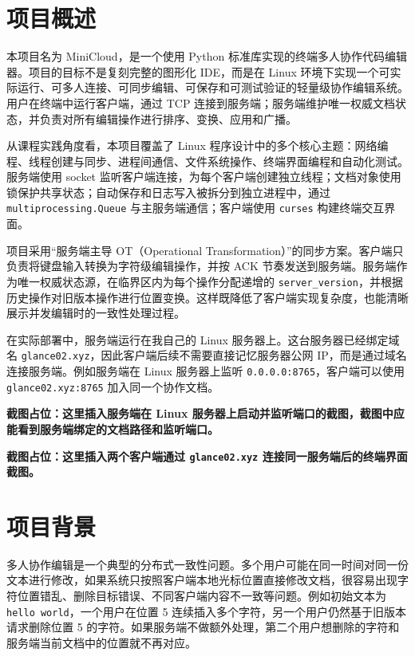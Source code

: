 \section{项目概述}

本项目名为 MiniCloud，是一个使用 Python 标准库实现的终端多人协作代码编辑器。项目的目标不是复刻完整的图形化 IDE，而是在 Linux 环境下实现一个可实际运行、可多人连接、可同步编辑、可保存和可测试验证的轻量级协作编辑系统。用户在终端中运行客户端，通过 TCP 连接到服务端；服务端维护唯一权威文档状态，并负责对所有编辑操作进行排序、变换、应用和广播。

从课程实践角度看，本项目覆盖了 Linux 程序设计中的多个核心主题：网络编程、线程创建与同步、进程间通信、文件系统操作、终端界面编程和自动化测试。服务端使用 socket 监听客户端连接，为每个客户端创建独立线程；文档对象使用锁保护共享状态；自动保存和日志写入被拆分到独立进程中，通过 \verb|multiprocessing.Queue| 与主服务端通信；客户端使用 \verb|curses| 构建终端交互界面。

项目采用“服务端主导 OT（Operational Transformation）”的同步方案。客户端只负责将键盘输入转换为字符级编辑操作，并按 ACK 节奏发送到服务端。服务端作为唯一权威状态源，在临界区内为每个操作分配递增的 \verb|server_version|，并根据历史操作对旧版本操作进行位置变换。这样既降低了客户端实现复杂度，也能清晰展示并发编辑时的一致性处理过程。

在实际部署中，服务端运行在我自己的 Linux 服务器上。这台服务器已经绑定域名 \verb|glance02.xyz|，因此客户端后续不需要直接记忆服务器公网 IP，而是通过域名连接服务端。例如服务端在 Linux 服务器上监听 \verb|0.0.0.0:8765|，客户端可以使用 \verb|glance02.xyz:8765| 加入同一个协作文档。

\textbf{截图占位：这里插入服务端在 Linux 服务器上启动并监听端口的截图，截图中应能看到服务端绑定的文档路径和监听端口。}

\textbf{截图占位：这里插入两个客户端通过 \texttt{glance02.xyz} 连接同一服务端后的终端界面截图。}

\section{项目背景}

多人协作编辑是一个典型的分布式一致性问题。多个用户可能在同一时间对同一份文本进行修改，如果系统只按照客户端本地光标位置直接修改文档，很容易出现字符位置错乱、删除目标错误、不同客户端内容不一致等问题。例如初始文本为 \verb|hello world|，一个用户在位置 5 连续插入多个字符，另一个用户仍然基于旧版本请求删除位置 5 的字符。如果服务端不做额外处理，第二个用户想删除的字符和服务端当前文档中的位置就不再对应。

